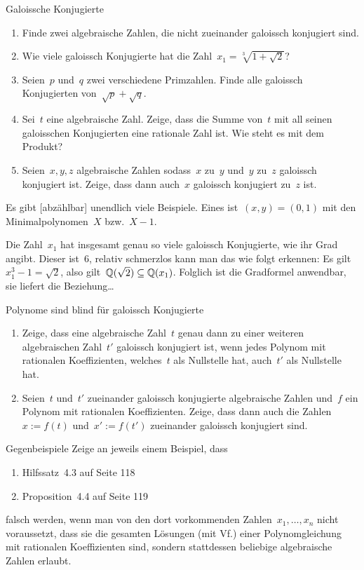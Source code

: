 \documentclass{algblatt}
\begin{document}
\begin{aufgabe}{Galoissche Konjugierte}
\begin{enumerate}
\item Finde zwei algebraische Zahlen, die nicht zueinander galoissch konjugiert
sind.
\item Wie viele galoissch Konjugierte hat die Zahl~$x_1 = \sqrt[3]{1 +
\sqrt{2}}$?
\item Seien~$p$ und~$q$ zwei verschiedene Primzahlen. Finde alle galoissch
Konjugierten von~$\sqrt{p} + \sqrt{q}$.
\item Sei~$t$ eine algebraische Zahl. Zeige, dass die Summe von~$t$ mit all
seinen galoisschen Konjugierten eine rationale Zahl ist. Wie steht es mit dem
Produkt?
\item Seien~$x, y, z$ algebraische Zahlen sodass~$x$ zu~$y$ und~$y$ zu~$z$
galoissch konjugiert ist. Zeige, dass dann auch~$x$ galoissch konjugiert zu~$z$
ist.
\end{enumerate}

\begin{loesungE}
\item Es gibt [abzählbar] unendlich viele Beispiele. Eines ist~$(x,y) = (0,1)$
mit den Minimalpolynomen~$X$ bzw.~$X-1$.

\item Die Zahl~$x_1$ hat insgesamt genau so viele galoissch Konjugierte, wie
ihr Grad angibt. Dieser ist~$6$, relativ schmerzlos kann man das wie folgt
erkennen: Es gilt~$x_1^3 - 1 = \sqrt{2}$, also gilt~$\mathbb{Q}(\sqrt{2}) \subseteq
\mathbb{Q}(x_1)$. Folglich ist die Gradformel anwendbar, sie liefert die
Beziehung\ldots
\end{loesungE}
\end{aufgabe}

\begin{aufgabe}{Polynome sind blind für galoissch Konjugierte}
\begin{enumerate}
\item Zeige, dass eine algebraische Zahl~$t$ genau dann zu einer weiteren
algebraischen Zahl~$t'$ galoissch konjugiert ist, wenn jedes Polynom mit
rationalen Koeffizienten, welches~$t$ als Nullstelle hat, auch~$t'$ als
Nullstelle hat.
\item Seien~$t$ und~$t'$ zueinander galoissch konjugierte algebraische Zahlen
und~$f$ ein Polynom mit rationalen Koeffizienten. Zeige, dass dann auch die
Zahlen~$x := f(t)$ und~$x' := f(t')$ zueinander galoissch konjugiert sind.
\end{enumerate}
\end{aufgabe}

\begin{aufgabe}{Gegenbeispiele}
Zeige an jeweils einem Beispiel, dass
\begin{enumerate}
\item Hilfssatz~4.3 auf Seite 118
\item Proposition~4.4 auf Seite 119
\end{enumerate}
falsch werden, wenn man von den dort vorkommenden Zahlen~$x_1,\ldots,x_n$ nicht
voraussetzt, dass sie die gesamten Lösungen (mit Vf.) einer Polynomgleichung
mit rationalen Koeffizienten sind, sondern stattdessen beliebige algebraische
Zahlen erlaubt.
\end{aufgabe}
\end{document}
